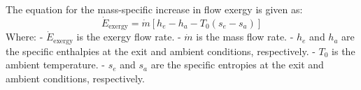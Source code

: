 The equation for the mass-specific increase in flow exergy is given as:  
\[
\dot{E}_{\text{exergy}} = \dot{m} \left[ h_e - h_a - T_0 (s_e - s_a) \right]
\]  
Where:  
- \( \dot{E}_{\text{exergy}} \) is the exergy flow rate.  
- \( \dot{m} \) is the mass flow rate.  
- \( h_e \) and \( h_a \) are the specific enthalpies at the exit and ambient conditions, respectively.  
- \( T_0 \) is the ambient temperature.  
- \( s_e \) and \( s_a \) are the specific entropies at the exit and ambient conditions, respectively.